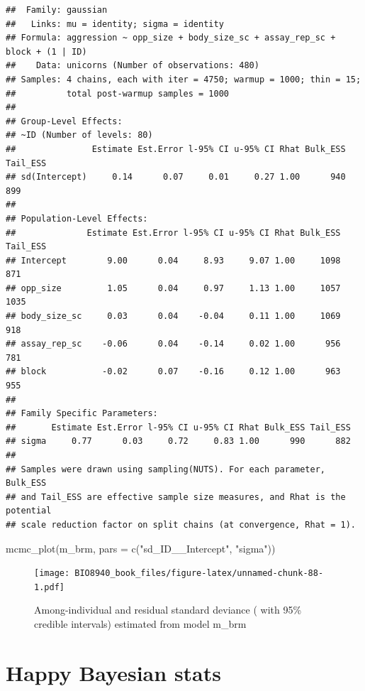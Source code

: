 \documentclass[
  12pt,
]{book}
\newenvironment{Shaded}{\begin{snugshade}}{\end{snugshade}}
\newcommand{\AttributeTok}[1]{\textcolor[rgb]{0.77,0.63,0.00}{#1}}
\newcommand{\FunctionTok}[1]{\textcolor[rgb]{0.00,0.00,0.00}{#1}}
\newcommand{\NormalTok}[1]{#1}
\newcommand{\StringTok}[1]{\textcolor[rgb]{0.31,0.60,0.02}{#1}}
\begin{document}
\begin{verbatim}
##  Family: gaussian 
##   Links: mu = identity; sigma = identity 
## Formula: aggression ~ opp_size + body_size_sc + assay_rep_sc + block + (1 | ID) 
##    Data: unicorns (Number of observations: 480) 
## Samples: 4 chains, each with iter = 4750; warmup = 1000; thin = 15;
##          total post-warmup samples = 1000
## 
## Group-Level Effects: 
## ~ID (Number of levels: 80) 
##               Estimate Est.Error l-95% CI u-95% CI Rhat Bulk_ESS Tail_ESS
## sd(Intercept)     0.14      0.07     0.01     0.27 1.00      940      899
## 
## Population-Level Effects: 
##              Estimate Est.Error l-95% CI u-95% CI Rhat Bulk_ESS Tail_ESS
## Intercept        9.00      0.04     8.93     9.07 1.00     1098      871
## opp_size         1.05      0.04     0.97     1.13 1.00     1057     1035
## body_size_sc     0.03      0.04    -0.04     0.11 1.00     1069      918
## assay_rep_sc    -0.06      0.04    -0.14     0.02 1.00      956      781
## block           -0.02      0.07    -0.16     0.12 1.00      963      955
## 
## Family Specific Parameters: 
##       Estimate Est.Error l-95% CI u-95% CI Rhat Bulk_ESS Tail_ESS
## sigma     0.77      0.03     0.72     0.83 1.00      990      882
## 
## Samples were drawn using sampling(NUTS). For each parameter, Bulk_ESS
## and Tail_ESS are effective sample size measures, and Rhat is the potential
## scale reduction factor on split chains (at convergence, Rhat = 1).
\end{verbatim}

\begin{Shaded}
\begin{Highlighting}[]
\FunctionTok{mcmc\_plot}\NormalTok{(m\_brm, }\AttributeTok{pars =} \FunctionTok{c}\NormalTok{(}\StringTok{"sd\_ID\_\_Intercept"}\NormalTok{, }\StringTok{"sigma"}\NormalTok{))}
\end{Highlighting}
\end{Shaded}

\begin{figure}
\centering
\texttt{[image: BIO8940\_book\_files/figure-latex/unnamed-chunk-88-1.pdf]}
\caption{\label{fig:unnamed-chunk-88}Among-individual and residual standard deviance ( with 95\% credible intervals) estimated from model m\_brm}
\end{figure}

\hypertarget{happy-bayesian-stats}{%
\section{Happy Bayesian stats}\label{happy-bayesian-stats}}
\end{document}
